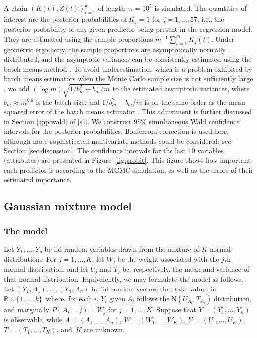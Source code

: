 \documentclass[12pt]{article}
\begin{document}
A chain $(K(t), Z(t))_{t=1}^m$ of length $m = 10^5$ is simulated.
The quantities of interest are the posterior probabilities of $K_j = 1$ for $j = 1,\dots,57$, i.e., the posterior probability of any given predictor being present in the regression model.
They are estimated using the sample proportions $m^{-1} \sum_{t=1}^m K_j(t)$.
Under geometric ergodicity, the sample proportions are asymptotically normally distributed, and the asymptotic variances can be consistently estimated using the batch means method \citep{jones2006fixed}.
To avoid underestimation, which is a problem exhibited by batch means estimators when the Monte Carlo sample size is not sufficiently large \citep[][Section 4]{flegal2010batch}, we add $(\log m) \sqrt{1/b_m^2+b_m/m}$ to the estimated asymptotic variances, where $b_m \approx m^{0.6}$ is the batch size, and $1/b_m^2 + b_m/m$ is on the same order as the mean squared error of the batch means estimator \citep[][Section 3]{flegal2010batch}.
This adjustment is further discussed in Section \ref{app:wald} of \ref{s1}.
We construct 95\% simultaneous Wald confidence intervals for the posterior probabilities.
Bonferroni correction is used here, although more sophisticated multivariate methods could be considered; see Section \ref{sec:discussion}.
The confidence intervals for the last 10 variables (attributes) are presented in Figure~\ref{fig:probit}.
This figure shows how important each predictor is according to the MCMC simulation, as well as the errors of their estimated importance.





{\subsection{Gaussian mixture model} \label{ssec:mixture}}

\subsubsection{The model}


Let $Y_1, \dots, Y_n$ be iid random variables drawn from the mixture of $K$ normal distributions.
For $j = 1,\dots,K$, let $W_j$ be the weight associated with the $j$th normal distribution, and let $U_j$ and $T_j$ be, respectively, the mean and variance of that normal distribution.
Equivalently, we may formulate the model as follows.
Let $(Y_1, A_1), \dots, (Y_n, A_n)$ be iid random vectors that take values in $\mathbb{R} \times \{1,\dots,k\}$, where, for each $i$, $Y_i$ given $A_i$ follows the $\mbox{N}(U_{A_i}, T_{A_i})$ distribution, and marginally $P(A_i = j) = W_j$ for $j = 1,\dots,K$.
Suppose that $Y = (Y_1, \dots, Y_n)$ is observable, while $A = (A_1, \dots, A_n)$, $W = (W_1, \dots, W_K)$, $U = (U_1, \dots, U_K)$, $T = (T_1, \dots, T_K)$, and~$K$ are unknown.
\end{document}

